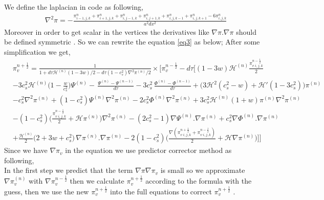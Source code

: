 \documentclass[a4paper,11pt]{article}
\begin{document}
We define the laplacian in code as following,
\begin{align}
& \nabla^2 \pi =-\frac{\pi^{n}_{i-1,j,k}+\pi^{n}_{i+1,j,k} +\pi^{n}_{i,j-1,k} +\pi^{n}_{i,j+1,k}+\pi^{n}_{i,j,k-1}+\pi^{n}_{i,j,k+1} -6 \pi^{n}_{i,j,k}  }{ a^2 dx^2}  
\end{align}
Moreover in order to get scalar in the vertices the derivatives like $\nabla \pi . \nabla \pi $ should be defined symmetric .
So we can rewrite the equation \ref{eq3} as below;
After some simplification we get,
\begin{align} 
%
 &\pi_v ^{n+\frac{1}{2}}= \frac{1}{1+ d\tau   \mathcal{H}^{(n)}  (1-3w) /2 - d\tau (1-c_s^2) \nabla^2 \pi^{(n)}/2} \times \Bigg[ \pi_v ^{n-\frac{1}{2}} - d \tau \Big [(1- 3w)\mathcal{H}^{(n)}   \frac{\pi_{v \; {i,j,k}}^{n-\frac{1}{2}} }{2}
     \nonumber
     \\
      &
  -3 { c_s^2 \mathcal{H}^{(n)}}\Big( 1- \frac{w}{c_s^2} \Big )\Psi^{(n) }
 - \, \frac{{\Psi}^{(n)}-{\Psi}^{(n-1)} }{d \tau}
      - 3  c_s^2  \, \frac{{\Phi}^{(n)}-{\Phi}^{(n-1)} }{d \tau}    
   +\Big( 3\mathcal{H}^2 (c_s^2 -w) + \mathcal{H}' (1-3c_s^2) \Big)\pi^{(n)}  
             \nonumber
     \\
      &
       - c_s^2 {\nabla^2 \pi ^{(n)}}  
   + (1-c_s^2)\Psi^{(n)} {\nabla^{2} \pi^{(n)}  }    
    - 2 c_s^2  \Phi ^{(n)}  {\nabla^2 \pi^{(n)}}
     + {3 c_s^2  \mathcal{H}^{(n)} (1+w) }\pi^{(n)} {\nabla^2 \pi^{(n)} }   
          \nonumber
     \\
      &
     -  (1-c_s^2)
 \Big( \frac{\pi_{v \; {i,j,k}}^{n-\frac{1}{2}} }{2} +\mathcal{H}  \pi^{(n)}  \Big) {\nabla^2  \pi^{(n)}} 
    - (2 c_s^2-1) {\nabla  \Psi^{(n)}  . \nabla \pi ^{(n)} }
    + c_s^2 {\nabla  \Phi ^{(n)} . \nabla \pi^{(n)}  }  
                              \nonumber
     \\
       & 
              +\frac{\mathcal{H}^{(n)}} {2 } \Big(2+3w+c_s^2  \Big) \,{\nabla  \pi^{(n)} . \nabla \pi^{(n)} }  
         -2(1-c_s^2) \Big( \frac{{ \nabla  ( \pi_{v  \; {i,j,k}}^{n+\frac{1}{2}} +\pi_{v \; {i,j,k}}^{n-\frac{1}{2}} ) }  } {2}  + \mathcal{H}  \nabla\pi^{(n)} \Big) 
    \Big] \Bigg]
\end{align}
Since we have $\nabla \pi_v $ in the equation we use predictor corrector method as following,\\
In the first step we predict that the term $\nabla \pi \nabla \pi_v$ is small so we approximate $\nabla \pi_v ^{(n)}$ with $\nabla \pi_v^{n-\frac{1}{2}}$ then we calculate $\pi_v^{n+\frac{1}{2}}$ according to the formula with the guess, then we use the new $\pi_v^{n+\frac{1}{2}}$ into the full equations to correct $\pi_v^{n+\frac{1}{2}}$ . \\
\end{document}

